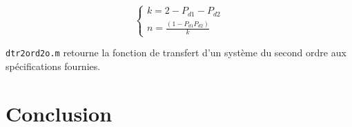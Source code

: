 \begin{equation}
	\begin{cases}
		k = 2-P_{d1}-P_{d2} \\[2mm]
		n = \frac{(1-P_{d1}P_{d2})}{k}
	\end{cases}
\end{equation}


\texttt{dtr2ord2o.m} retourne la fonction de transfert d'un système du second ordre aux spécifications fournies.

\section{Conclusion}
